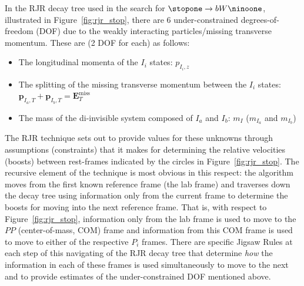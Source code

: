 In the RJR decay tree used in the search for $\stopone \rightarrow b W \ninoone$, illustrated
in Figure~\ref{fig:rjr_stop}, there are 6 under-constrained degrees-of-freedom (DOF) due to the
weakly interacting particles/missing transverse momentum.
These are (2 DOF for each) as follows:
\begin{itemize}
    \item The longitudinal momenta of the $I_i$ states: $p_{I_i,z}$
    \item The splitting of the missing transverse momentum between the $I_i$ states: $\bm{p}_{I_a,T} + \bm{p}_{I_b,T} = \bm{E}_T^{\text{miss}}$
    \item The mass of the di-invisible system composed of $I_a$ and $I_b$: $m_I$ ($m_{I_a}$ and $m_{I_b}$)
\end{itemize}
The RJR technique sets out to provide values for these unknowns through assumptions (constraints) that it makes
for determining the relative velocities (boosts) between rest-frames indicated by the circles in Figure~\ref{fig:rjr_stop}.
The recursive element of the technique is most obvious in this respect: the algorithm moves from
the first known reference frame (the lab frame) and traverses down the decay tree using information
only from the current frame to determine the boosts for moving into the next reference frame.
That is, with respect to Figure~\ref{fig:rjr_stop}, information only from the lab frame
is used to move to the $PP$ (center-of-mass, COM) frame and information from this COM frame
is used to move to either of the respective $P_i$ frames.
There are specific Jigsaw Rules at each step of this navigating of the RJR decay tree that determine
\textit{how} the information in each of these frames is used simultaneously to move to the next
and to provide estimates of the under-constrained DOF mentioned above.

